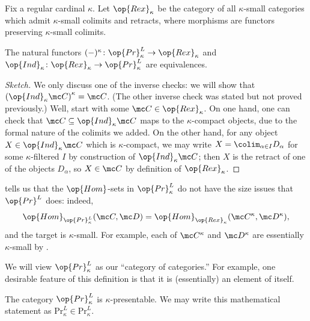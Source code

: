 \documentclass[../notes.tex]{subfiles}
\begin{document}
\begin{notation}
	Fix a regular cardinal $\kappa$. Let $\op{Rex}_\kappa$ be the category of all $\kappa$-small categories which admit $\kappa$-small colimits and retracts, where morphisms are functors preserving $\kappa$-small colimits.
\end{notation}
\begin{theorem} \label{thm:gab-ulm}
	The natural functors $(-)^\kappa\colon{\op{Pr}_\kappa^L}\to{\op{Rex}_\kappa}$ and $\op{Ind}_\kappa\colon{\op{Rex}_\kappa}\to\op{Pr}_\kappa^L$ are equivalences.
\end{theorem}
\begin{proof}[Sketch]
	We only discuss one of the inverse checks: we will show that $\left(\op{Ind}_\kappa\mc C\right)^\kappa=\mc C$. (The other inverse check was stated but not proved previously.) Well, start with some $\mc C\in\op{Rex}_\kappa$. On one hand, one can check that $\mc C\subseteq\op{Ind}_\kappa\mc C$ maps to the $\kappa$-compact objects, due to the formal nature of the colimits we added. On the other hand, for any object $X\in\op{Ind}_\kappa\mc C$ which is $\kappa$-compact, we may write $X=\colim_{\alpha\in I}D_\alpha$ for some $\kappa$-filtered $I$ by construction of $\op{Ind}_\kappa\mc C$; then $X$ is the retract of one of the objects $D_\alpha$, so $X\in\mc C$ by definition of $\op{Rex}_\kappa$.
\end{proof}
\begin{remark}
	 tells us that the $\op{Hom}$-sets in $\op{Pr}^L_\kappa$ do not have the size issues that $\op{Pr}^L$ does: indeed,
	\[\op{Hom}_{\op{Pr}^L_\kappa}(\mc C,\mc D)=\op{Hom}_{\op{Rex}_\kappa}(\mc C^\kappa,\mc D^\kappa),\]
	and the target is $\kappa$-small. For example, each of $\mc C^\kappa$ and $\mc D^\kappa$ are essentially $\kappa$-small by .
\end{remark}
We will view $\op{Pr}^L_\kappa$ as our ``category of categories.'' For example, one desirable feature of this definition is that it is (essentially) an element of itself.
\begin{theorem}
	The category $\op{Pr}^L_\kappa$ is $\kappa$-presentable. We may write this mathematical statement as $\mathrm{Pr}^L_\kappa\in\mathrm{Pr}^L_\kappa$.
\end{theorem}
\end{document}
